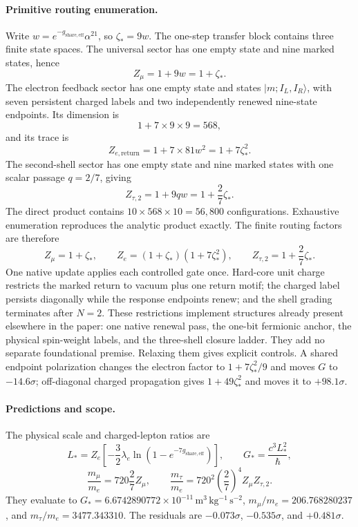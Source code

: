\documentclass[11pt]{article}
\begin{document}
\paragraph{Primitive routing enumeration.}
Write $w=e^{-g_{\mathrm{share,eff}}}\alpha^{21}$, so $\zeta_*=9w$. The one-step transfer block contains three finite state spaces. The universal sector has one empty state and nine marked states, hence
\[
Z_\mu=1+9w=1+\zeta_*.
\]
The electron feedback sector has one empty state and states $|m;I_L,I_R\rangle$, with seven persistent charged labels and two independently renewed nine-state endpoints. Its dimension is
\[
1+7\times9\times9=568,
\]
and its trace is
\[
Z_{e,\mathrm{return}}=1+7\times81w^2
=1+7\zeta_*^2.
\]
The second-shell sector has one empty state and nine marked states with one scalar passage $q=2/7$, giving
\[
Z_{\tau,2}=1+9qw=1+\frac27\zeta_*.
\]
The direct product contains $10\times568\times10=56{,}800$ configurations. Exhaustive enumeration reproduces the analytic product exactly. The finite routing factors are therefore
\[
Z_\mu=1+\zeta_*,
\qquad
Z_e=(1+\zeta_*)(1+7\zeta_*^2),
\qquad
Z_{\tau,2}=1+\frac27\zeta_*.
\]
One native update applies each controlled gate once. Hard-core unit charge restricts the marked return to vacuum plus one return motif; the charged label persists diagonally while the response endpoints renew; and the shell grading terminates after $N=2$. These restrictions implement structures already present elsewhere in the paper: one native renewal pass, the one-bit fermionic anchor, the physical spin-weight labels, and the three-shell closure ladder. They add no separate foundational premise. Relaxing them gives explicit controls. A shared endpoint polarization changes the electron factor to $1+7\zeta_*^2/9$ and moves $G$ to $-14.6\sigma$; off-diagonal charged propagation gives $1+49\zeta_*^2$ and moves it to $+98.1\sigma$.

\paragraph{Predictions and scope.}
The physical scale and charged-lepton ratios are
\[
L_*=Z_e\left[-\frac32\lambda_e\ln(1-e^{-7g_{\mathrm{share,eff}}})\right],
\qquad
G_*=\frac{c^3L_*^2}{\hbar},
\]
\[
\frac{m_\mu}{m_e}=720\frac27Z_\mu,
\qquad
\frac{m_\tau}{m_e}=720^2\left(\frac27\right)^4Z_\mu Z_{\tau,2}.
\]
They evaluate to $G_*=6.6742890772\times10^{-11}\,\mathrm{m^3\,kg^{-1}\,s^{-2}}$, $m_\mu/m_e=206.768280237$, and $m_\tau/m_e=3477.343310$. The residuals are $-0.073\sigma$, $-0.535\sigma$, and $+0.481\sigma$.
\end{document}
